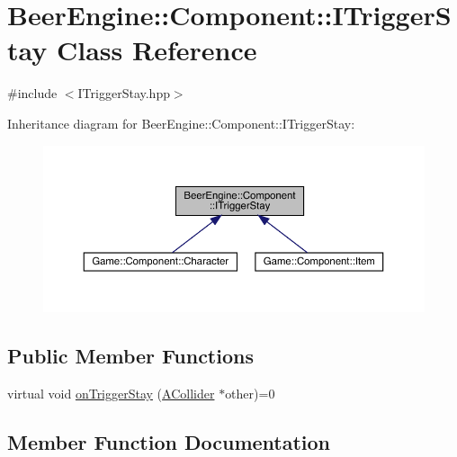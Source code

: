 \hypertarget{class_beer_engine_1_1_component_1_1_i_trigger_stay}{}\section{Beer\+Engine\+:\+:Component\+:\+:I\+Trigger\+Stay Class Reference}
\label{class_beer_engine_1_1_component_1_1_i_trigger_stay}


{\ttfamily \#include $<$I\+Trigger\+Stay.\+hpp$>$}



Inheritance diagram for Beer\+Engine\+:\+:Component\+:\+:I\+Trigger\+Stay\+:
\nopagebreak
\begin{figure}[H]
\begin{center}
\leavevmode
\includegraphics[width=350pt]{class_beer_engine_1_1_component_1_1_i_trigger_stay__inherit__graph}
\end{center}
\end{figure}
\subsection*{Public Member Functions}
\begin{DoxyCompactItemize}
\item 
virtual void \mbox{\hyperlink{class_beer_engine_1_1_component_1_1_i_trigger_stay_ae0b762108ab5484071657e13f7a2cbd7}{on\+Trigger\+Stay}} (\mbox{\hyperlink{class_beer_engine_1_1_component_1_1_a_collider}{A\+Collider}} $\ast$other)=0
\end{DoxyCompactItemize}


\subsection{Member Function Documentation}
\mbox{\label{class_beer_engine_1_1_component_1_1_i_trigger_stay_ae0b762108ab5484071657e13f7a2cbd7}} 
